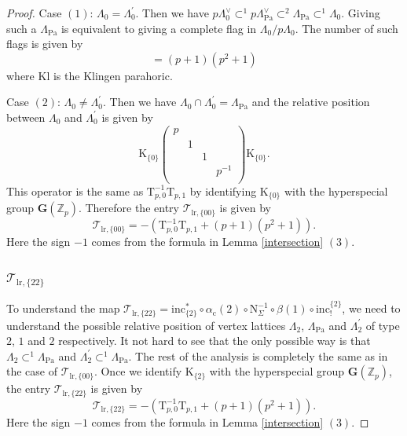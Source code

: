 \documentclass[10pt]{amsart}
\numberwithin{equation}{section}
\theoremstyle{definition}
\def\lr{\mathrm{lr}}
\def\Pa{\mathrm{Pa}}
\def\Kl{\mathrm{Kl}}
\def\calT{\mathcal{T}}
\def\bfG{\mathbf{G}}
\def\ZZ{\mathbb{Z}}
\def\rmc{\mathrm{c}}
\def\rmK{\mathrm{K}}
\def\rmN{\mathrm{N}}
\def\rmT{\mathrm{T}}
\begin{document}
\begin{proof}
Case $(1)$: $\Lambda_{0}=\Lambda^{\prime}_{0}$. Then we have $p\Lambda^{\vee}_{0}\subset^{1}p\Lambda^{\vee}_{\Pa}\subset^{2} \Lambda_{\Pa}\subset ^{1}\Lambda_{0}$. Giving such a $\Lambda_{\Pa}$ is equivalent to giving a complete flag in $\Lambda_{0}/p\Lambda_{0}$. The number of such flags is given by 
\begin{equation*}
[\bfG(\ZZ_{p}): \Kl]=(p+1)(p^{2}+1) 
\end{equation*}
where $\Kl$ is the Klingen parahoric.
 
Case $(2)$: $\Lambda_{0}\neq\Lambda^{\prime}_{0}$. Then we have $\Lambda_{0}\cap\Lambda^{\prime}_{0}=\Lambda_{\Pa}$ and the relative position between $\Lambda_{0}$ and $\Lambda^{\prime}_{0}$ is given by
\begin{equation*}
\rmK_{\{0\}}\begin{pmatrix}p&&&\\&1&&\\&&1&\\&&&p^{-1}\\\end{pmatrix}\rmK_{\{0\}}.
\end{equation*}
This operator is the same as $\rmT^{-1}_{p,0}\rmT_{p,1}$ by identifying $\rmK_{\{0\}}$ with the hyperspecial group $\bfG(\ZZ_{p})$. Therefore the entry $\calT_{\mathrm{lr}, \{00\}}$ is given by  
\begin{equation*}
\calT_{\mathrm{lr}, \{00\}}=-(\rmT^{-1}_{p,0}\rmT_{p,1}+(p+1)(p^{2}+1)). 
\end{equation*}
Here the sign $-1$ comes from the formula in Lemma \ref{intersection} $(3)$.

\subsubsection{$\calT_{\mathrm{lr}, \{22\}}$} To understand the map $\calT_{\lr, \{22\}}=\mathrm{inc}^{\ast}_{\{2\}} \circ\alpha_{\rmc}(2)\circ\rmN^{-1}_{\Sigma}\circ\beta(1)\circ\mathrm{inc}^{\{2\}}_{!}$, we need to understand the possible relative position of vertex lattices $\Lambda_{2}$, $\Lambda_{\Pa}$ and $\Lambda^{\prime}_{2}$ of type $2$, $1$ and $2$ respectively. It not hard to see that the only possible way is that $\Lambda_{2}\subset^{1}\Lambda_{\Pa}$ and  $\Lambda^{\prime}_{2}\subset^{1}\Lambda_{\Pa}$. The rest of the analysis is completely the same as in the case of $\calT_{\lr,\{00\}}$. Once we identify $\rmK_{\{2\}}$ with the hyperspecial group $\bfG(\ZZ_{p})$, the entry $\calT_{\lr, \{22\}}$ is given by 
\begin{equation*}
\calT_{\lr, \{22\}}=-(\rmT^{-1}_{p,0}\rmT_{p,1}+(p+1)(p^{2}+1)). 
\end{equation*}
Here the sign $-1$ comes from the formula in Lemma \ref{intersection} $(3)$.


\end{proof}
\end{document}

